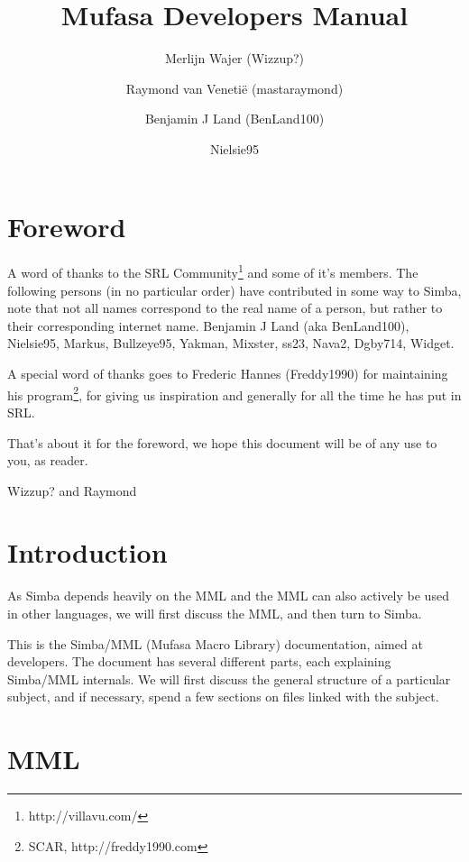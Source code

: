 \documentclass[a4paper, 10pt]{report} %
\begin{document}
\title{Mufasa Developers Manual}
\author{Merlijn Wajer (Wizzup?) \and Raymond van Veneti\"{e} (mastaraymond) 
\and Benjamin J Land (BenLand100) \and Nielsie95}
\maketitle
\tableofcontents
% 

\chapter{Foreword}

A word of thanks to the SRL Community\footnote{http://villavu.com/} and some of
it's members.
The following persons (in no particular order) have contributed in some way to
Simba, note that not all names correspond to the real name of a person, but
rather to their corresponding internet name.
Benjamin J Land (aka BenLand100), Nielsie95, Markus, Bullzeye95,
Yakman, Mixster, ss23, Nava2, Dgby714, Widget.

A special word of thanks goes to Frederic Hannes (Freddy1990) for maintaining
his program\footnote{SCAR, http://freddy1990.com}, for giving us inspiration
and generally for all the time he has put in SRL.

That's about it for the foreword, we hope this document will be of any use to
you, as reader.

Wizzup? and Raymond

\chapter{Introduction}

As Simba depends heavily on the MML and the MML can also actively be used in 
other languages, we will first discuss the MML, and then turn to Simba.

This is the Simba/MML (Mufasa Macro Library) documentation, aimed at
developers. The document has several different parts, each explaining
Simba/MML internals. We will first discuss the general structure of a
particular subject, and if necessary, spend a few sections on files
linked with the subject.

\chapter{MML}
\end{document}
